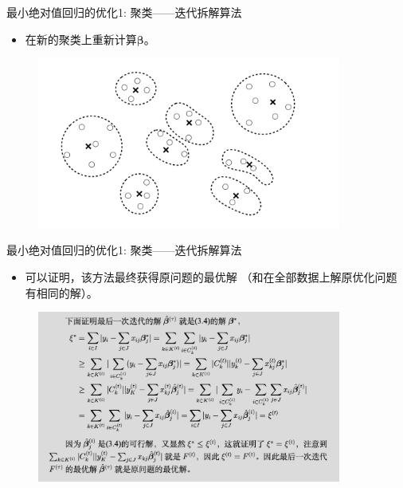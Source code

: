 \begin{frame}{最小绝对值回归的优化1: 聚类——迭代拆解算法}
    \begin{itemize}
        \item 在新的聚类上重新计算$\bm \beta$。
    \end{itemize}
\begin{figure}[H]
\includegraphics[width=10cm]{pics/aid-demo-c.pdf}
\end{figure}
\end{frame}

\begin{frame}{最小绝对值回归的优化1: 聚类——迭代拆解算法}
    \begin{itemize}
        \item 可以证明，该方法最终获得原问题的最优解
        （和在全部数据上解原优化问题有相同的解）。
    \end{itemize}
\begin{figure}[H]
\includegraphics[width=10cm]{pics/proof-aid.png}
\end{figure}
\end{frame}